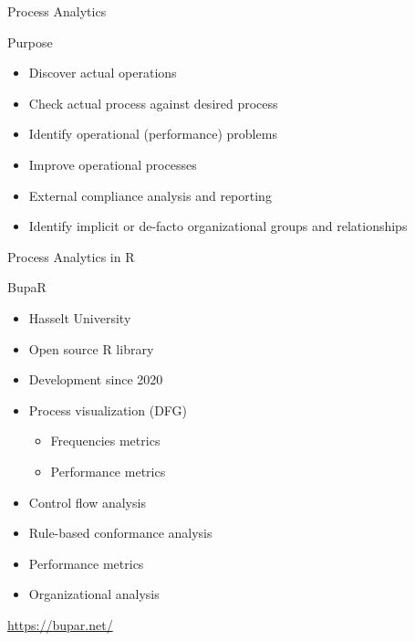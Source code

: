 \documentclass[ignorenonframetext,xcolor=x11names]{beamer}
\begin{document}
\begin{frame}{Process Analytics}
\begin{block}{Purpose}
\begin{itemize}
   \item Discover actual operations
   \item Check actual process against desired process
   \item Identify operational (performance) problems
   \item Improve operational processes
   \item External compliance analysis and reporting
   \item Identify implicit or de-facto organizational groups and relationships 
\end{itemize}
\end{block}
\end{frame}

\begin{frame}{Process Analytics in R}
\begin{block}{BupaR}
\begin{itemize}
   \item Hasselt University
   \item Open source R library
   \item Development since 2020
   \item Process visualization (DFG)
   \begin{itemize}
      \item Frequencies metrics
      \item Performance metrics
   \end{itemize}
   \item Control flow analysis
   \item Rule-based conformance analysis
   \item Performance metrics
   \item Organizational analysis
\end{itemize}
\end{block}
\vspace{.5\baselineskip}
\url{https://bupar.net/}

\end{frame}
\end{document}
